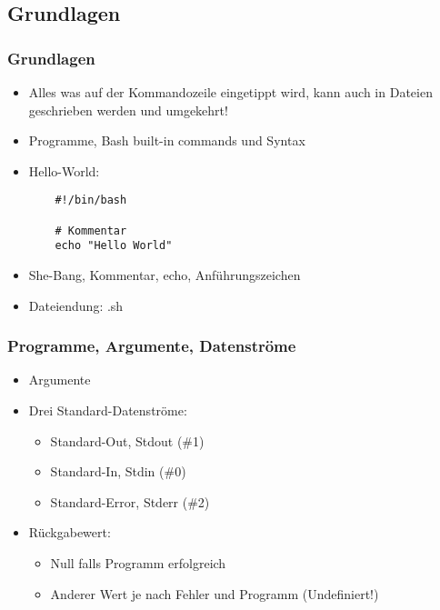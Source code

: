 \documentclass{beamer}
\begin{document}
\subsection{Grundlagen}
\begin{frame}[fragile,label=code]
 \frametitle{Grundlagen}
 
 \begin{itemize}
  \item Alles was auf der Kommandozeile eingetippt wird, kann auch in Dateien geschrieben werden und umgekehrt!
  \item Programme, Bash built-in commands und Syntax
  \item Hello-World:
  \begin{lstlisting}
    #!/bin/bash
    
    # Kommentar
    echo "Hello World"
  \end{lstlisting}
  \item She-Bang, Kommentar, echo, Anführungszeichen
  \item Dateiendung: .sh
 \end{itemize}
\end{frame}

\begin{frame}[fragile]
 \frametitle{Programme, Argumente, Datenströme}
 
  
 \begin{itemize}[<+->]
  \item Argumente
  \item Drei Standard-Datenströme:
   \begin{itemize}[<+->]
     \item Standard-Out, Stdout (\#1)
     \item Standard-In, Stdin (\#0)
     \item Standard-Error, Stderr (\#2)
   \end{itemize}
 \item Rückgabewert:
   \begin{itemize}
       \item Null falls Programm erfolgreich
       \item Anderer Wert je nach Fehler und Programm (Undefiniert!)
   \end{itemize}
 \end{itemize}
\end{frame}
\end{document}
